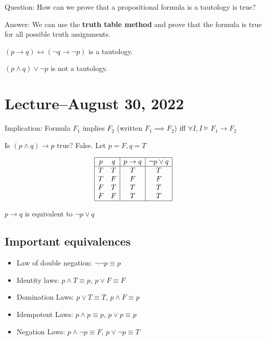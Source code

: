 \documentclass{scrreprt}
\begin{document}
Question: How can we prove that a propositional formula is a tautology is true?

Answer: We can use the \textbf{truth table method} and prove that the formula is true for all possible truth assignments.

\begin{example}[Tautology]
	$(p\rightarrow q)\leftrightarrow (\neg q \rightarrow \neg p)$ is a tautology.

	$(p\land q)\lor \neg p$ is not a tautology.
\end{example}

\section{Lecture--August 30, 2022}

Implication: Formula $F_1$ implies $F_2$ (written $F_1\implies F_2$) iff
$\forall I, I\models F_1\rightarrow F_2$

\begin{example}
	Is $(p\land q)\rightarrow p$ true? False. Let $p=F, q=T$

	\[
		\begin{array}{|c c|c|c|}
			\hline
			p & q & p\rightarrow q & \neg p \lor q \\
			\hline
			T & T & T              & T             \\
			T & F & F              & F             \\
			F & T & T              & T             \\
			F & F & T              & T             \\
			\hline
		\end{array}
	\]
\end{example}

\begin{definition}
	$p\rightarrow q$ is equivalent to $\neg p\lor q$
\end{definition}

\subsection{Important equivalences}

\begin{itemize}
	\item Law of double negation: $\neg \neg p \equiv p$
	\item Identity laws: $p\land T \equiv p$, $p\lor F \equiv F$
	\item Domination Laws: $p\lor T \equiv T$, $p\land F \equiv p$
	\item Idempotent Laws: $p\land p \equiv p$, $p\lor p \equiv p$
	\item Negation Laws: $p\land \neg p\equiv F$, $p\lor \neg p \equiv T$
\end{itemize}
\end{document}
